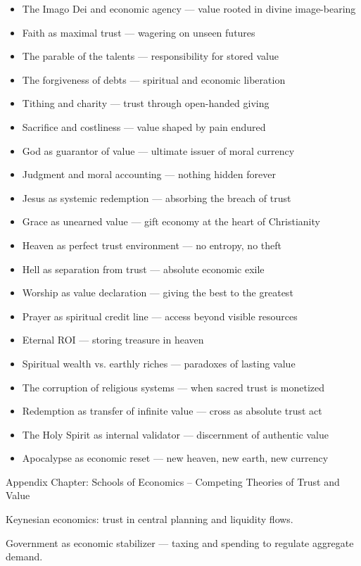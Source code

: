 \documentclass[11pt,oneside]{book}
\begin{document}
\begin{itemize}
\item The Imago Dei and economic agency — value rooted in divine image-bearing
\item Faith as maximal trust — wagering on unseen futures
\item The parable of the talents — responsibility for stored value
\item The forgiveness of debts — spiritual and economic liberation
\item Tithing and charity — trust through open-handed giving
\item Sacrifice and costliness — value shaped by pain endured
\item God as guarantor of value — ultimate issuer of moral currency
\item Judgment and moral accounting — nothing hidden forever
\item Jesus as systemic redemption — absorbing the breach of trust
\item Grace as unearned value — gift economy at the heart of Christianity
\item Heaven as perfect trust environment — no entropy, no theft
\item Hell as separation from trust — absolute economic exile
\item Worship as value declaration — giving the best to the greatest
\item Prayer as spiritual credit line — access beyond visible resources
\item Eternal ROI — storing treasure in heaven
\item Spiritual wealth vs. earthly riches — paradoxes of lasting value
\item The corruption of religious systems — when sacred trust is monetized
\item Redemption as transfer of infinite value — cross as absolute trust act
\item The Holy Spirit as internal validator — discernment of authentic value
\item Apocalypse as economic reset — new heaven, new earth, new currency
\end{itemize}

Appendix Chapter: Schools of Economics – Competing Theories of Trust and Value

Keynesian economics: trust in central planning and liquidity flows.

Government as economic stabilizer — taxing and spending to regulate aggregate demand.
\end{document}
